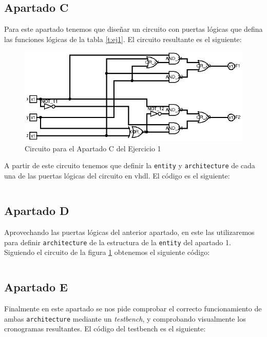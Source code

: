 \documentclass[a4paper,titlepage]{article}
\begin{document}
		\subsection{Apartado C}
			Para este apartado tenemos que diseñar un circuito con puertas lógicas que defina las funciones lógicas
			de la tabla \ref{t:ej1}. El circuito resultante es el siguiente:\\
			\begin{figure}[h]
				\centering
				\includegraphics[width=\textwidth]{../Ejercicio1/circuitos/ejercicio1_c.png}
				\caption{Circuito para el Apartado C del Ejercicio 1}
				\label{f:circ_ej1_c}
			\end{figure}

			A partir de este circuito tenemos que definir la \texttt{entity} y \texttt{architecture} de cada una de las
			puertas lógicas del circuito en vhdl. El código es el siguiente:\\
			\inputminted[]{vhdl}{../Ejercicio1/vhdl/ej1_c.vhd}
		\subsection{Apartado D}
			Aprovechando las puertas lógicas del anterior apartado, en este las utilizaremos para definir 
			\texttt{architecture} de la estructura de la \texttt{entity} del apartado 1. Siguiendo el circuito 
			de la figura \ref{f:circ_ej1_c} obtenemos el siguiente código:\\
			\inputminted[breaklines]{vhdl}{../Ejercicio1/vhdl/ej1_d.vhd}
		\subsection{Apartado E}
			Finalmente en este apartado se nos pide comprobar el correcto funcionamiento de ambas \texttt{architecture}
			mediante un \textit{testbench}, y comprobando visualmente los cronogramas resultantes. El código del testbench es 
			el siguiente:\\
			\inputminted[breaklines]{vhdl}{../Ejercicio1/vhdl/ej1_e.vhd}
\end{document}
